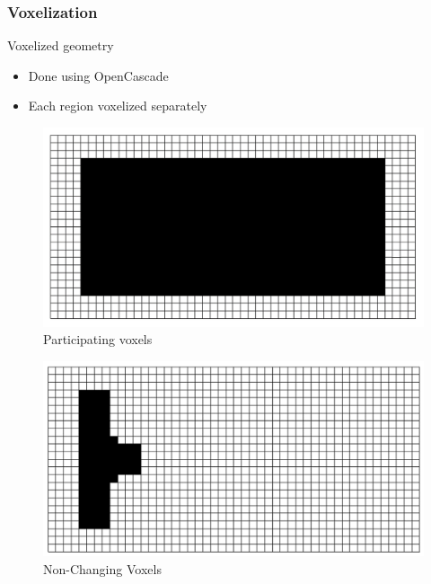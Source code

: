 \subsubsection{Voxelization}
\begin{frame}{Voxelized geometry}
\begin{itemize}
\item Done using OpenCascade  
\item Each region voxelized separately 
\end{itemize}
\vspace{0.4cm}
\begin{minipage}{0.49\textwidth}
\begin{figure}
\includegraphics[width=.8\textwidth]{Pictures/Voxels/Active_2.png}
\caption{Participating voxels}
\end{figure}
\vspace{-0.6cm}
 \begin{figure}
\includegraphics[width=.8\textwidth]{Pictures/Voxels/NonChanging.png}
\caption{Non-Changing Voxels}
\end{figure}
\end{minipage}

\end{frame}
